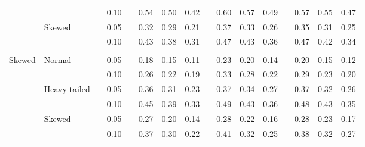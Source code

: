 \documentclass[12pt]{article} %
\begin{document}
\begin{table}[ht]
\begin{scriptsize}
\begin{center}
\begin{tabular}{ll p{.1cm} c p{.1cm} rrr p{.1cm} rrr p{.1cm} rrr}
             &              && 0.10 &&   0.54 & 0.50 & 0.42 && 0.60 & 0.57 & 0.49 &&   0.57 & 0.55 & 0.47 \\
             & Skewed       && 0.05 &&   0.32 & 0.29 & 0.21 && 0.37 & 0.33 & 0.26 &&   0.35 & 0.31 & 0.25 \\
             &              && 0.10 &&   0.43 & 0.38 & 0.31 && 0.47 & 0.43 & 0.36 &&   0.47 & 0.42 & 0.34 \\
             &&&&&&&&&&&&&&&\\
Skewed       & Normal       && 0.05 &&   0.18 & 0.15 & 0.11 && 0.23 & 0.20 & 0.14 &&  0.20 & 0.15 & 0.12 \\ 
             &              && 0.10 &&   0.26 & 0.22 & 0.19 && 0.33 & 0.28 & 0.22 &&  0.29 & 0.23 & 0.20 \\ 
             & Heavy tailed && 0.05 &&   0.36 & 0.31 & 0.23 && 0.37 & 0.34 & 0.27 &&  0.37 & 0.32 & 0.26 \\ 
             &              && 0.10 &&   0.45 & 0.39 & 0.33 && 0.49 & 0.43 & 0.36 &&  0.48 & 0.43 & 0.35 \\ 
             & Skewed       && 0.05 &&   0.27 & 0.20 & 0.14 && 0.28 & 0.22 & 0.16 &&  0.28 & 0.23 & 0.17 \\ 
             &              && 0.10 &&   0.37 & 0.30 & 0.22 && 0.41 & 0.32 & 0.25 &&  0.38 & 0.32 & 0.27 \\ 




\end{tabular}
\end{center}
\end{scriptsize}
\end{table}
\end{document}
